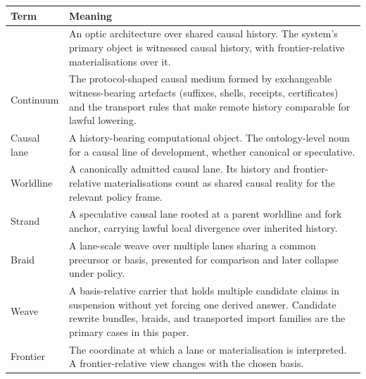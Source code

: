 \documentclass{aion}
\begin{document}
\begin{center}
		\AIONTableStyleOn
		\begin{tabularx}{\textwidth}{@{}>{\raggedright\arraybackslash}p{}X@{}}
			\toprule
			\AIONTableHead
			Term           & Meaning                                                                                                                                                                                                                     \\
			\midrule
	\WARP{}        & An optic architecture over shared causal history. The system's primary object is witnessed causal history, with frontier-relative materialisations over it.                                                                        \\
			Continuum      & The protocol-shaped causal medium formed by exchangeable witness-bearing artefacts (suffixes, shells, receipts, certificates) and the transport rules that make remote history comparable for lawful lowering.                        \\
			Causal lane    & A history-bearing computational object. The ontology-level noun for a causal line of development, whether canonical or speculative.                                                                                         \\
			Worldline      & A canonically admitted causal lane. Its history and frontier-relative materialisations count as shared causal reality for the relevant policy frame.                                                                        \\
			Strand         & A speculative causal lane rooted at a parent worldline and fork anchor, carrying lawful local divergence over inherited history.                                                                                            \\
	Braid          & A lane-scale weave over multiple lanes sharing a common precursor or basis, presented for comparison and later collapse under policy.                                                                                          \\
		Weave          & A basis-relative carrier that holds multiple candidate claims in suspension without yet forcing one derived answer. Candidate rewrite bundles, braids, and transported import families are the primary cases in this paper. \\
		Frontier       & The coordinate at which a lane or materialisation is interpreted. A frontier-relative view changes with the chosen basis.                                                                                                   \\

\end{tabularx}
\end{center}
\end{document}
